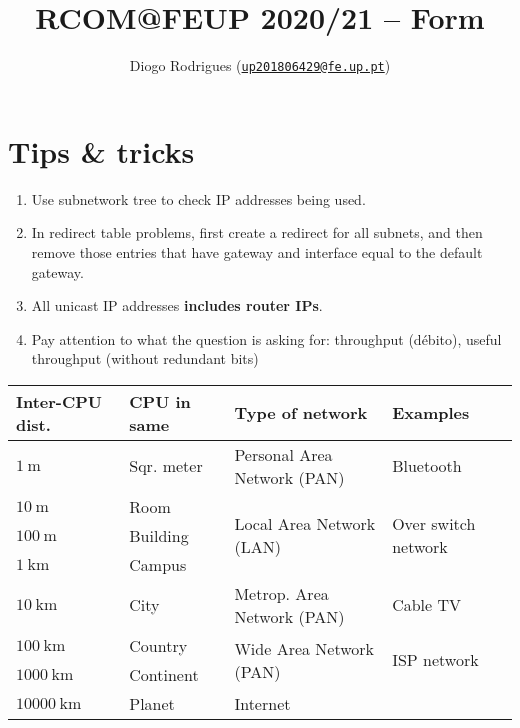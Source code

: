 \documentclass{form}
\author{Diogo Rodrigues (\texttt{\href{mailto:up201806429@fe.up.pt}{up201806429@fe.up.pt}})}
\title{RCOM@FEUP 2020/21 -- Form}
\begin{document}

\maketitle

\begin{minipage}{0.425\textwidth}
    \section*{Tips \& tricks}
    \begin{enumerate}
        \setlength\itemsep{-0.2em}
        \item Use subnetwork tree to check IP addresses being used.
        \item In redirect table problems, first create a redirect for all subnets, and then remove those entries that have gateway and interface equal to the default gateway.
        \item All unicast IP addresses \textbf{includes router IPs}.
        \item Pay attention to what the question is asking for: throughput (débito), useful throughput (without redundant bits)
    \end{enumerate}
\end{minipage}
\begin{minipage}{38em}
    \begin{tabular}{@{}l | l | l | p{5.4em}@{}}
        \textbf{Inter-CPU dist.} & \textbf{CPU in same} & \textbf{Type of network} & \textbf{Examples} \\ \hline
        $\SI{    1}{     \meter}$ & Sqr. meter   & Personal Area Network (PAN)               & Bluetooth \\ \hline
        $\SI{   10}{     \meter}$ & Room         & \multirow{3}{*}{Local Area Network (LAN)} & \multirow{3}{5.4em}{Over switch network} \\ \cline{1-2}
        $\SI{  100}{     \meter}$ & Building     &                                           & \\ \cline{1-2}
        $\SI{    1}{\kilo\meter}$ & Campus       &                                           & \\ \hline
        $\SI{   10}{\kilo\meter}$ & City         & Metrop. Area Network (PAN)                & Cable TV \\ \hline
        $\SI{  100}{\kilo\meter}$ & Country      & \multirow{2}{*}{Wide Area Network (PAN)}  & \multirow{2}{5.4em}{ISP network} \\ \cline{1-2}
        $\SI{ 1000}{\kilo\meter}$ & Continent    &                                           & \\ \hline
        $\SI{10000}{\kilo\meter}$ & Planet       & Internet                                  & \\
    \end{tabular}
\end{minipage}
\end{document}
